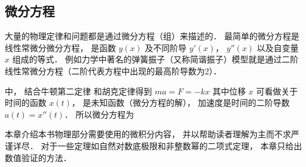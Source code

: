 \subsection{微分方程}
大量的物理定律和问题都是通过微分方程（组）来描述的． 最简单的微分方程是线性常微分微分方程，%
是函数 $y(x)$ 及不同阶导 $y'(x)$， $y''(x)$ 以及自变量 $x$ 组成的等式． 例如力学中著名的弹簧振子（又称简谐振子）模型就是通过二阶线性常微分方程（二阶代表方程中出现的最高阶导数为2）．

中， 结合牛顿第二定律 和胡克定律得到 $ma = F = -kx$ 其中位移 $x$ 可看做关于时间的函数 $x(t)$， 是未知函数（微分方程的解）， 加速度是时间的二阶导数 $a(t) = x''(t)$． 所以微分方程为 

本章介绍本书物理部分需要使用的微积分内容， 并以帮助读者理解为主而不求严谨详尽． 对于一些定理如自然对数底极限和非整数幂的二项式定理， 本章只给出数值验证的方法．



